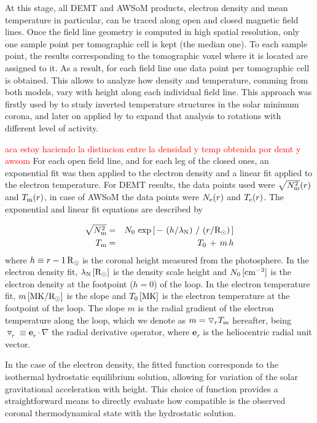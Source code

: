\documentclass[namedreferences]{solarphysics}
\renewcommand{\l}{\lambda_{\rm N}}%
\newcommand{\mrsun}{{\rm R_\odot}}
\newcommand{\MK}{{\rm MK}}
\newcommand{\cm}{{\rm cm}}
\newcommand{\cminvc}{\cm^{-3}}
\newcommand{\dr}{\triangledown_r}
\newcommand{\er}{\mathbf{e}_r}
\newcommand{\Te}{T_{\rm e}}
\newcommand{\Tm}{T_{\rm m}}
\newcommand{\Ne}{N_{\rm e}}
\newcommand{\Nsqm}{N^2_{{\rm m}}}
\newcommand{\sqravgN}{\sqrt{\Nsqm}}
\def\diego#1{\textcolor{red}{#1}}
\begin{document}
\begin{article}
At this stage, all DEMT and AWSoM products, electron density and mean temperature in particular, can be traced along open and closed magnetic field lines. Once the field line geometry is computed in high spatial resolution, only one sample point per tomographic cell is kept (the median one). To each sample point, the results corresponding to the tomographic voxel where it is located are assigned to it. As a result, for each field line one data point per tomographic cell is obtained. This allows to analyze how density and temperature, comming from both models, vary with height along each individual field line. This approach was firstly used by \citet{huang_2012} to study inverted temperature structures in the solar minimum corona, and later on applied by \citet{nuevo_2013} to expand that analysis to rotations with different level of activity.

\diego{aca estoy haciendo la distincion entre la densidad y temp obtenida por demt y awsom}
For each open field line, and for each leg of the closed ones, an exponential fit was then applied to the electron density and a linear fit applied to the electron temperature. For DEMT results, the data points used were $\sqravgN(r)$ and $\Tm(r)$, in case of AWSoM the data points were $\Ne(r)$ and $\Te(r)$. The exponential and linear fit equations are described by

\begin{eqnarray}\label{Nfit}
\sqravgN &=& N_0\,\exp{\left[\,-\,\left(h/\l\right)\,/\,\left(r/\mrsun\right)\,\right]}\\
\label{Tfit}
\Tm &=& T_0\,+\,m\,h
\end{eqnarray}
\noindent
where $h \equiv r - 1\,\mrsun$ is the coronal height measured from the photosphere. In the electron density fit, $\l\,[\mrsun]$ is the density scale height and $N_0\,[\cminvc]$ is the electron density at the footpoint ($h=0$) of the loop. In the electron temperature fit, $m\,[\MK/\mrsun]$ is the slope and $T_0\,[\MK]$ is the electron temperature at the footpoint of the loop. The slope $m$ is the radial gradient of the electron temperature along the loop, which we denote as $m = \dr\Tm$ hereafter, being $\dr\equiv\er\cdot\nabla$ the radial derivative operator, where $\er$ is the heliocentric radial unit vector.

In the case of the electron density, the fitted function corresponds to the isothermal hydrostatic equilibrium solution, allowing for variation of the solar gravitational acceleration with height. This choice of function provides a straightforward means to directly evaluate how compatible is the observed coronal thermodynamical state with the hydrostatic solution.


\end{article}
\end{document}
